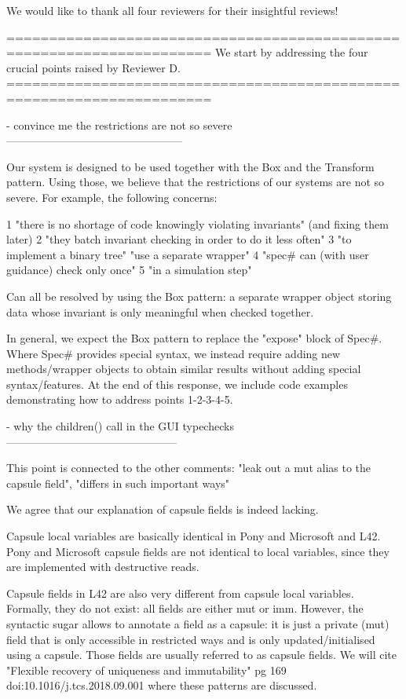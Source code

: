 We would like to thank all four reviewers for their insightful reviews!

======================================================================
We start by addressing the four crucial points raised by Reviewer D.
======================================================================

- convince me the restrictions are not so severe
------------------------------------------------

Our system is designed to be used together with the Box and the Transform pattern.
Using those, we believe that the restrictions of our systems are not so severe.
For example, the following concerns:

1 "there is no shortage of code knowingly violating invariants" (and fixing them later)
2 "they batch invariant checking in order to do it less often"
3 "to implement a binary tree" "use a separate wrapper"
4 "spec# can (with user guidance) check only once"
5 "in a simulation step"

Can all be resolved by using the Box pattern: a separate wrapper object storing data
whose invariant is only meaningful when checked together.

In general, we expect the Box pattern to replace the "expose" block of Spec#.
Where Spec# provides special syntax, we instead require adding new methods/wrapper
objects to obtain similar results without adding special syntax/features.
At the end of this response, we include code examples demonstrating how to address points 1-2-3-4-5.

- why the children() call in the GUI typechecks
-----------------------------------------------

This point is connected to the other comments: "leak out a mut alias to the capsule field", "differs in such important ways"

We agree that our explanation of capsule fields is indeed lacking.

Capsule local variables are basically identical in Pony and Microsoft and L42.
Pony and Microsoft capsule fields are not identical to local variables, since they are implemented with destructive reads.

Capsule fields in L42 are also very different from capsule local variables.
Formally, they do not exist: all fields are either mut or imm.
However, the syntactic sugar allows to annotate a field as a capsule:
it is just a private (mut) field that is only
accessible in restricted ways and is only updated/initialised using a capsule.
Those fields are usually referred to as capsule fields.
We will cite "Flexible recovery of uniqueness and immutability" 
pg 169 doi:10.1016/j.tcs.2018.09.001 where these patterns are discussed.

